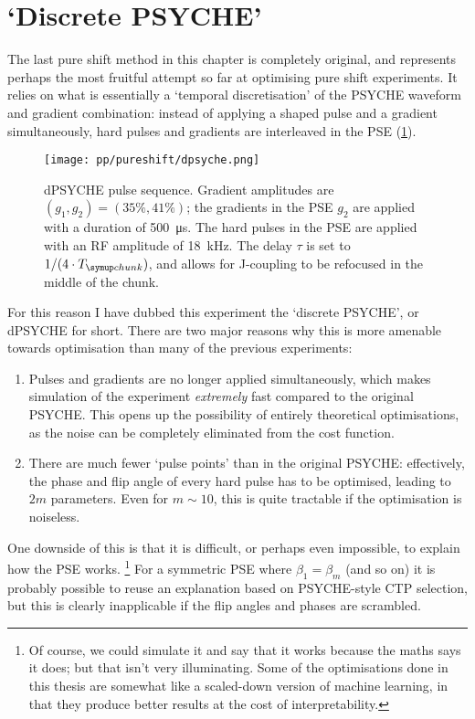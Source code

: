 \section{`Discrete PSYCHE'}
\label{sec:pureshift__dpsyche}

The last pure shift method in this chapter is completely original, and represents perhaps the most fruitful attempt so far at optimising pure shift experiments.
It relies on what is essentially a `temporal discretisation' of the PSYCHE waveform and gradient combination: instead of applying a shaped pulse and a gradient simultaneously, hard pulses and gradients are interleaved in the PSE (\cref{fig:dpsyche_pulseq}).

\begin{figure}[htb]
    \centering
    \texttt{[image: pp/pureshift/dpsyche.png]}%
    \caption[dPSYCHE pulse sequence]{
        dPSYCHE pulse sequence.
        Gradient amplitudes are $(g_1, g_2) = (35\%, 41\%)$; the gradients in the PSE $g_2$ are applied with a duration of \qty{500}{\us}.
        The hard pulses in the PSE are applied with an RF amplitude of \qty{18}{\kHz}.
        The delay $\tau$ is set to $1/(4 \cdot \Tchunk)$, and allows for J-coupling to be refocused in the middle of the chunk.
    }
    \label{fig:dpsyche_pulseq}
\end{figure}

For this reason I have dubbed this experiment the `discrete PSYCHE', or dPSYCHE for short.
There are two major reasons why this is more amenable towards optimisation than many of the previous experiments:
\begin{enumerate}
    \item Pulses and gradients are no longer applied simultaneously, which makes simulation of the experiment \textit{extremely} fast compared to the original PSYCHE.
        This opens up the possibility of entirely theoretical optimisations, as the noise can be completely eliminated from the cost function.
        
    \item There are much fewer `pulse points' than in the original PSYCHE: effectively, the phase and flip angle of every hard pulse has to be optimised, leading to $2m$ parameters.
        Even for $m \sim 10$, this is quite tractable if the optimisation is noiseless.
\end{enumerate}

One downside of this is that it is difficult, or perhaps even impossible, to explain how the PSE works.%
\footnote{Of course, we could simulate it and say that it works because the maths says it does; but that isn't very illuminating. Some of the optimisations done in this thesis are somewhat like a scaled-down version of machine learning, in that they produce better results at the cost of interpretability.}
For a symmetric PSE where $\beta_1 = \beta_m$ (and so on) it is probably possible to reuse an explanation based on PSYCHE-style CTP selection, but this is clearly inapplicable if the flip angles and phases are scrambled.



